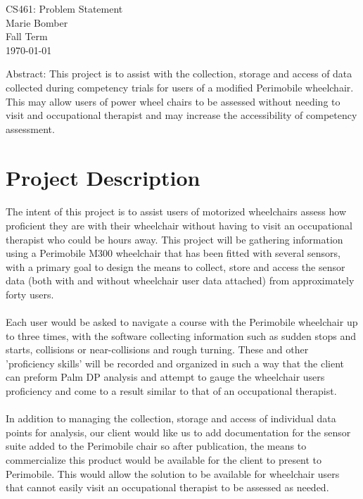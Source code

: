 \documentclass[letterpaper,10pt,titlepage]{article}
\def\name{Marie Bomber}
\begin{document}
\begin{titlepage}
	\centering
		\Huge{CS461: Problem Statement}\\
		\bigskip
		\large{\name}\\
		\bigskip
		\large{Fall Term}\\
		\bigskip
		\large{\today}\\
	\raggedright \normalsize Abstract: This project is to assist with the collection, storage and access of data collected during competency trials for users of a modified Perimobile wheelchair. This may allow users of power wheel chairs to be assessed without needing to visit and occupational therapist and may increase the accessibility of competency assessment.
\end{titlepage}
\section{Project Description}
\paragraph{} The intent of this project is to assist users of motorized wheelchairs assess how proficient they are with their wheelchair without having to visit an occupational therapist who could be hours away. This project will be gathering information using a Perimobile M300 wheelchair that has been fitted with several sensors, with a primary goal to design the means to collect, store and access the sensor data (both with and without wheelchair user data attached) from approximately forty users. 
\paragraph{} Each user would be asked to navigate a course with the Perimobile wheelchair up to three times, with the software collecting information such as sudden stops and starts, collisions or near-collisions and rough turning. These and other 'proficiency skills' will be recorded and organized in such a way that the client can preform Palm DP analysis and attempt to gauge the wheelchair users proficiency and come to a result similar to that of an occupational therapist.
\paragraph{} In addition to managing the collection, storage and access of individual data points for analysis, our client would like us to add documentation for the sensor suite added to the Perimobile chair so after publication, the means to commercialize this product would be available for the client to present to Perimobile. This would allow the solution to be available for wheelchair users that cannot easily visit an occupational therapist to be assessed as needed. 
\end{document}
